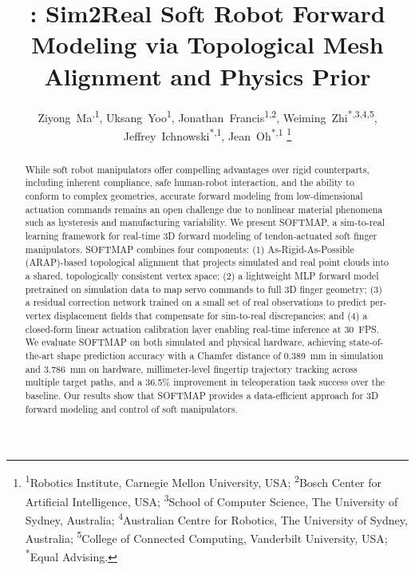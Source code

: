\documentclass[letterpaper, 10 pt, conference]{ieeeconf}  %
\title{\LARGE \bf
\algname: Sim2Real Soft Robot Forward Modeling via Topological Mesh Alignment and Physics Prior
}
\author{
Ziyong~Ma\textsuperscript{\Letter,1},
Uksang~Yoo\textsuperscript{1},
Jonathan~Francis\textsuperscript{1,2},
Weiming~Zhi\textsuperscript{*,3,4,5},
Jeffrey~Ichnowski\textsuperscript{*,1},
Jean~Oh\textsuperscript{*,1}
\thanks{\textsuperscript{1}Robotics Institute, Carnegie Mellon University, USA;
\textsuperscript{2}Bosch Center for Artificial Intelligence, USA;
\textsuperscript{3}School of Computer Science, The University of Sydney, Australia;
\textsuperscript{4}Australian Centre for Robotics, The University of Sydney, Australia;
\textsuperscript{5}College of Connected Computing, Vanderbilt University, USA;
\textsuperscript{*}Equal Advising.}
}
\newcommand{\algname}{SOFTMAP\xspace}
\begin{document}
\maketitle
\vspace{-20mm}
\thispagestyle{empty}
\pagestyle{empty}




\begin{abstract}
While soft robot manipulators offer compelling advantages over rigid counterparts, including inherent compliance, safe human-robot interaction, and the ability to conform to complex geometries, accurate forward modeling from low-dimensional actuation commands remains an open challenge due to nonlinear material phenomena such as hysteresis and manufacturing variability. We present \algname, a sim-to-real learning framework for real-time 3D forward modeling of tendon-actuated soft finger manipulators. \algname combines four components: (1) As-Rigid-As-Possible (ARAP)-based topological alignment that projects simulated and real point clouds into a shared, topologically consistent vertex space; (2) a lightweight MLP forward model pretrained on simulation data to map servo commands to full 3D finger geometry; (3) a residual correction network trained on a small set of real observations to predict per-vertex displacement fields that compensate for sim-to-real discrepancies; and (4) a closed-form linear actuation calibration layer enabling real-time inference at 30~FPS. We evaluate \algname on both simulated and physical hardware, achieving state-of-the-art shape prediction accuracy with a Chamfer distance of 0.389~mm in simulation and 3.786~mm on hardware, millimeter-level fingertip trajectory tracking across multiple target paths, and a 36.5\% improvement in teleoperation task success over the baseline. Our results show that \algname provides a data-efficient approach for 3D forward modeling and control of soft manipulators.
\end{abstract}
\end{document}
